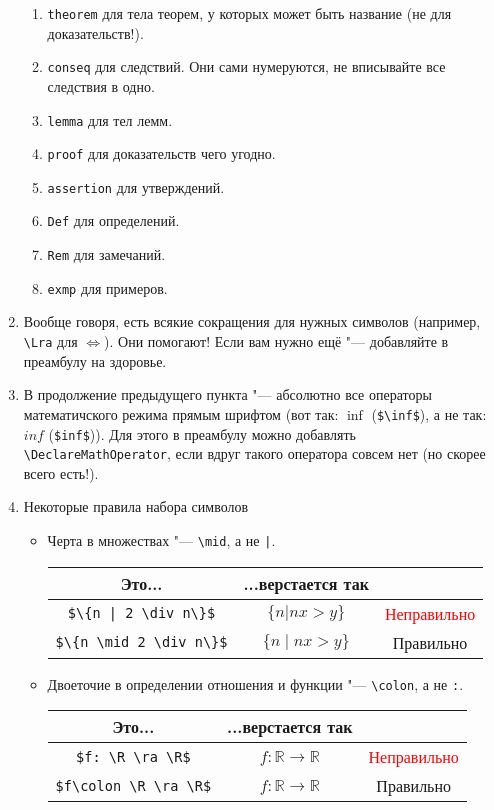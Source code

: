 \documentclass[12pt,a4paper]{book}
\def\ra{\rightarrow}
\def\Lra{\Leftrightarrow}
\def\R{\mathbb{R}}
\newcounter{theorem}[section]
\newcounter{conseq}[theorem]
\newcommand{\ok}{& \textcolor{green!60!black}{Правильно}}
\newcommand{\bad}{& \textcolor{red}{Неправильно}}
\begin{document}
\begin{enumerate}
\begin{enumerate}
\item \verb'theorem' для тела теорем, у которых может быть название (не для доказательств!).
\item \verb'conseq' для следствий. Они сами нумеруются, не вписывайте все следствия в одно.
\item \verb'lemma' для тел лемм.
\item \verb'proof' для доказательств чего угодно.
\item \verb'assertion' для утверждений.
\item \verb'Def' для определений.
\item \verb'Rem' для замечаний.
\item \verb'exmp' для примеров.
\end{enumerate}
\item Вообще говоря, есть всякие сокращения для нужных символов (например, \verb'\Lra' для $\Lra$). Они помогают! Если вам нужно ещё "--- добавляйте в преамбулу на здоровье.
\item В продолжение предыдущего пункта "--- абсолютно все операторы математичского режима прямым шрифтом (вот так: $\inf$ (\verb'$\inf$'), а не так: $inf$ (\verb'$inf$')). Для этого в преамбулу можно добавлять \verb'\DeclareMathOperator', если вдруг такого оператора совсем нет (но скорее всего есть!).
\item Некоторые правила набора символов
\begin{itemize}
\item Черта в множествах "--- \verb'\mid', а не \verb'|'.
\begin{center}\begin{tabular}{|c|c|c|}
\hline Это... & ...верстается так & \\
\hline \verb'$\{n | 2 \div n\}$' & $\{n | nx > y\}$ \bad \\
\hline \verb'$\{n \mid 2 \div n\}$' & $\{n \mid nx > y\}$ \ok \\
\hline
\end{tabular}\end{center}
\item Двоеточие в определении отношения и функции "--- \verb'\colon', а не \verb':'.
\begin{center}\begin{tabular}{|c|c|c|}
\hline Это... & ...верстается так & \\
\hline \verb'$f: \R \ra \R$' & $f:\R\ra\R$ \bad \\
\hline \verb'$f\colon \R \ra \R$' & $f\colon\R\ra\R$ \ok \\

\end{tabular}
\end{center}
\end{itemize}
\end{enumerate}
\end{document}
